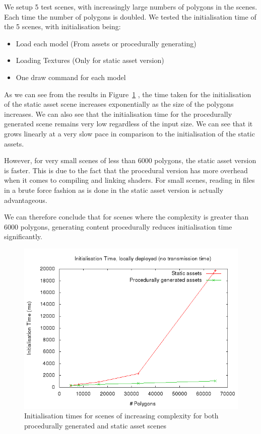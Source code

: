 We setup 5 test scenes, with increasingly large numbers of polygons in the scenes.
Each time the number of polygons is doubled.
We tested the initialisation time of the 5 scenes, with initialisation being:
\begin{itemize}
	\item Load each model (From assets or procedurally generating)
	\item Loading Textures (Only for static asset version)
	\item One draw command for each model
\end{itemize}

As we can see from the results in Figure~\ref{fig:perfresultslocal} , the time taken for the initialisation of the static asset scene increases exponentially as the size of the polygons increases.
We can also see that the initialisation time for the procedurally generated scene remains very low regardless of the input size.
We can see that it grows linearly at a very slow pace in comparison to the initialisation of the static assets.

However, for very small scenes of less than 6000 polygons, the static asset version is faster.
This is due to the fact that the procedural version has more overhead when it comes to compiling and linking shaders.
For small scenes, reading in files in a brute force fashion as is done in the static asset version is actually advantageous.

We can therefore conclude that for scenes where the complexity is greater than 6000 polygons, generating content procedurally reduces initialisation time significantly.

\begin{figure}
  \centering
  \includegraphics[width=1.0\textwidth]{images/perfresultslocal}
  \caption{Initialisation times for scenes of increasing complexity for both procedurally generated and static asset scenes}
  \label{fig:perfresultslocal}
\end{figure}

